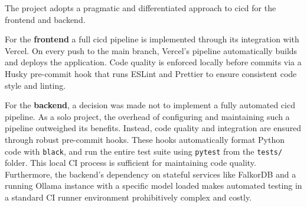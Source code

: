 The project adopts a pragmatic and differentiated approach to \acs{cicd} for the frontend and backend.

For the \textbf{frontend} a full \acs{cicd} pipeline is implemented through its integration with Vercel. On every push to the main branch, Vercel's pipeline automatically builds and deploys the application. Code quality is enforced locally before commits via a Husky pre-commit hook that runs ESLint and Prettier to ensure consistent code style and linting.

For the \textbf{backend}, a decision was made not to implement a fully automated \acs{cicd} pipeline. As a solo project, the overhead of configuring and maintaining such a pipeline outweighed its benefits. Instead, code quality and integration are ensured through robust pre-commit hooks. These hooks automatically format Python code with \texttt{black}, and run the entire test suite using \texttt{pytest} from the \texttt{tests/} folder. This local CI process is sufficient for maintaining code quality. Furthermore, the backend's dependency on stateful services like FalkorDB and a running Ollama instance with a specific model loaded makes automated testing in a standard CI runner environment prohibitively complex and costly.